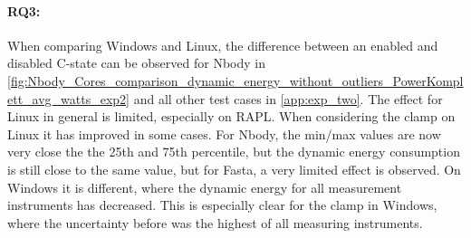 \paragraph*{RQ3:} When comparing Windows and Linux, the difference between an enabled and disabled C-state can be observed for Nbody in \cref{fig:Nbody_Cores_comparison_dynamic_energy_without_outliers_PowerKomplett_avg_watts_exp2} and all other test cases in \cref{app:exp_two}. The effect for Linux in general is limited, especially on RAPL. When considering the clamp on Linux it has improved in some cases. For Nbody, the min/max values are now very close the the 25th and 75th percentile, but the dynamic energy consumption is still close to the same value, but for Fasta, a very limited effect is observed. On Windows it is different, where the dynamic energy for all measurement instruments has decreased. This is especially clear for the clamp in Windows, where the uncertainty before was the highest of all measuring instruments.




